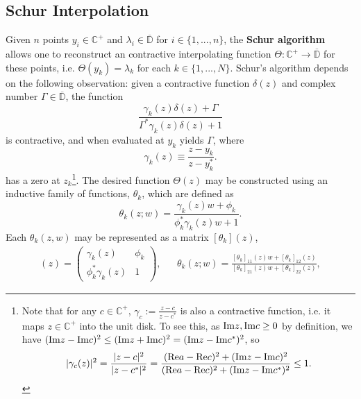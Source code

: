 \subsection{Schur Interpolation}
\label{subsec:schur_interpolation}

Given $n$ points $y_i\in\mathbb C^+$ and $\lambda_i\in\overline{\mathbb D}$ for $i\in \{1, ..., n\}$, the \textbf{Schur algorithm}~\cite{10.1155/S1687120003212028} allows one to reconstruct an contractive interpolating function $\Theta : \mathbb C^+\rightarrow\overline{\mathbb D}$ for these points, i.e. $\Theta (y_k) = \lambda_k$ for each $k\in \{1, ..., N\}$. Schur's algorithm depends on the following observation: given a contractive function $\delta(z)$ and complex number $\Gamma\in\overline{\mathbb D}$, the function
\begin{equation}
    \frac{\gamma_k(z) \delta(z) + \Gamma}{\Gamma^*\gamma_k(z) \delta(z) + 1}
    \label{eq:contractive_fn_schur}
\end{equation}
is contractive, and when evaluated at $y_k$ yields $\Gamma$, where
\begin{equation}
    \gamma_k(z)\equiv \frac{z - y_k}{z - y_k^*}.
\end{equation}
has a zero at $z_k$\footnote{Note that for any $c\in\mathbb C^+$, $\gamma_c := \frac{z - c}{z - c^*}$ is also a contractive function, i.e. it maps $z\in\mathbb C^+$ into the unit disk. To see this, as $\mathrm{Im} z, \mathrm{Im} c\geq 0$ by definition, we have $(\mathrm{Im} z - \mathrm{Im} c)^2\leq (\mathrm{Im} z + \mathrm{Im} c)^2 = (\mathrm{Im} z - \mathrm{Im} c^*)^2$, so
$$
|\gamma_c(z)|^2 = \frac{|z - c|^2}{|z - c^*|^2} = \frac{(\mathrm{Re} a - \mathrm{Re} c)^2 + (\mathrm{Im} z - \mathrm{Im} c)^2}{(\mathrm{Re} a - \mathrm{Re} c)^2 + (\mathrm{Im} z - \mathrm{Im} c^*)^2} \leq 1.
$$
}.
The desired function $\Theta(z)$ may be constructed using an inductive family of functions, $\theta_k$, which are defined as
\begin{equation}
    \theta_k(z; w) = \frac{\gamma_k(z) w + \phi_k}{\phi_k^*\gamma_k(z) w + 1}.
\end{equation}
Each $\theta_k(z, w)$ may be represented as a matrix $[\theta_k](z)$, 
\begin{align}
    [\theta_k](z) = \begin{pmatrix} \gamma_k(z) & \phi_k \\ \phi_k^* \gamma_k(z) & 1 \end{pmatrix}, 
    &&
    \theta_k(z; w) = \frac{[\theta_k]_{11}(z) w + [\theta_k]_{12}(z)}{[\theta_k]_{21}(z) w + [\theta_k]_{22}(z)},
\end{align}
